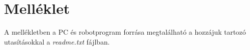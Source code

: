 \chapter*{Melléklet}
A mellékletben a PC és robotprogram forrása megtalálható a hozzájuk tartozó utasításokkal a \textit{readme.txt} fájlban.